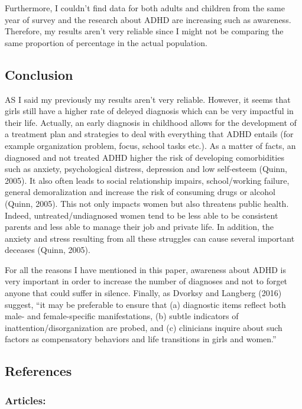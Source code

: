 \documentclass[
]{article}
\begin{document}
Furthermore, I couldn't find data for both adults and children from the
same year of survey and the research about ADHD are increasing such as
awareness. Therefore, my results aren't very reliable since I might not
be comparing the same proportion of percentage in the actual population.

\hypertarget{conclusion}{%
\subsection{Conclusion}\label{conclusion}}

AS I said my previously my results aren't very reliable. However, it
seems that girls still have a higher rate of deleyed diagnosis which can
be very impactful in their life. Actually, an early diagnosis in
childhood allows for the development of a treatment plan and strategies
to deal with everything that ADHD entails (for example organization
problem, focus, school tasks etc.). As a matter of facts, an diagnosed
and not treated ADHD higher the risk of developing comorbidities such as
anxiety, psychological distress, depression and low self-esteem (Quinn,
2005). It also often leads to social relationship impairs,
school/working failure, general demoralization and increase the risk of
consuming drugs or alcohol (Quinn, 2005). This not only impacts women
but also threatens public health. Indeed, untreated/undiagnosed women
tend to be less able to be consistent parents and less able to manage
their job and private life. In addition, the anxiety and stress
resulting from all these struggles can cause several important deceases
(Quinn, 2005).

For all the reasons I have mentioned in this paper, awareness about ADHD
is very important in order to increase the number of diagnoses and not
to forget anyone that could suffer in silence. Finally, as Dvorksy and
Langberg (2016) suggest, ``it may be preferable to ensure that (a)
diagnostic items reflect both male- and female-specific manifestations,
(b) subtle indicators of inattention/disorganization are probed, and (c)
clinicians inquire about such factors as compensatory behaviors and life
transitions in girls and women.''

\hypertarget{references}{%
\subsection{References}\label{references}}

\hypertarget{articles}{%
\subsubsection{Articles:}\label{articles}}
\end{document}
